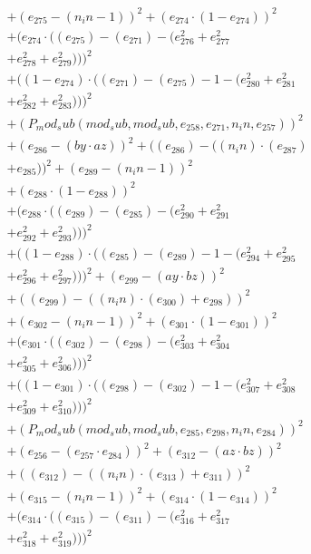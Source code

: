 \documentclass[10pt, a4paper]{article}
\begin{document}
\begin{align*}
& + (e_{275} - (n_in - 1))^{2} + (e_{274}  \cdot  (1 - e_{274}))^{2} \\
& + (e_{274}  \cdot  ((e_{275}) - (e_{271}) - (e_{276}^{2} + e_{277}^{2} \\
& + e_{278}^{2} + e_{279}^{2})))^{2} \\
& + ((1 - e_{274})  \cdot  ((e_{271}) - (e_{275}) - 1 - (e_{280}^{2} + e_{281}^{2} \\
& + e_{282}^{2} + e_{283}^{2})))^{2} \\
& + (P_mod_sub(mod_sub, mod_sub, e_{258}, e_{271}, n_in, e_{257}))^{2} \\
& + (e_{286} - (by  \cdot  az))^{2} + ((e_{286}) - ((n_in)  \cdot  (e_{287}) \\
& + e_{285}))^{2} + (e_{289} - (n_in - 1))^{2} \\
& + (e_{288}  \cdot  (1 - e_{288}))^{2} \\
& + (e_{288}  \cdot  ((e_{289}) - (e_{285}) - (e_{290}^{2} + e_{291}^{2} \\
& + e_{292}^{2} + e_{293}^{2})))^{2} \\
& + ((1 - e_{288})  \cdot  ((e_{285}) - (e_{289}) - 1 - (e_{294}^{2} + e_{295}^{2} \\
& + e_{296}^{2} + e_{297}^{2})))^{2} + (e_{299} - (ay  \cdot  bz))^{2} \\
& + ((e_{299}) - ((n_in)  \cdot  (e_{300}) + e_{298}))^{2} \\
& + (e_{302} - (n_in - 1))^{2} + (e_{301}  \cdot  (1 - e_{301}))^{2} \\
& + (e_{301}  \cdot  ((e_{302}) - (e_{298}) - (e_{303}^{2} + e_{304}^{2} \\
& + e_{305}^{2} + e_{306}^{2})))^{2} \\
& + ((1 - e_{301})  \cdot  ((e_{298}) - (e_{302}) - 1 - (e_{307}^{2} + e_{308}^{2} \\
& + e_{309}^{2} + e_{310}^{2})))^{2} \\
& + (P_mod_sub(mod_sub, mod_sub, e_{285}, e_{298}, n_in, e_{284}))^{2} \\
& + (e_{256} - (e_{257}  \cdot  e_{284}))^{2} + (e_{312} - (az  \cdot  bz))^{2} \\
& + ((e_{312}) - ((n_in)  \cdot  (e_{313}) + e_{311}))^{2} \\
& + (e_{315} - (n_in - 1))^{2} + (e_{314}  \cdot  (1 - e_{314}))^{2} \\
& + (e_{314}  \cdot  ((e_{315}) - (e_{311}) - (e_{316}^{2} + e_{317}^{2} \\
& + e_{318}^{2} + e_{319}^{2})))^{2} \\

\end{align*}
\end{document}
